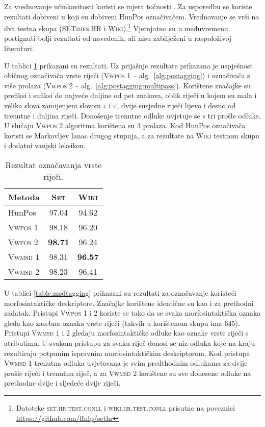 Za vrednovanje učinkovitosti koristi se mjera točnosti . Za
usporedbu se koriste rezultati dobiveni u \citep{agic2013lemmatization} koji su
dobiveni HunPos označivačem. Vrednovanje se vrši na dva testna skupa
(\textsc{SETimes.HR} i \textsc{Wiki}).\footnote{Datoteke
\textsc{set.hr.test.conll} i \textsc{wiki.hr.test.conll} prisutne na poveznici
\url{https://github.com/ffnlp/sethr}} Vjerojatno su u međuvremenu postignuti
bolji rezultati od navedenih, ali nisu zabilježeni u raspoloživoj literaturi.

U tablici \ref{table:postagging} prikazani su rezultati. Uz prijašnje rezultate
prikazana je uspješnost običnog označivača vrste riječi (\textsc{Vwpos 1} --
alg.~\ref{alg:postagging}) i označivača s više prolaza (\textsc{Vwpos 2} --
alg.~\ref{alg:postagging:multipass}). Korištene značajke su prefiksi i sufiksi
do najveće duljine od pet znakova, oblik riječi u kojem su mala i velika slova
zamijenjeni slovom \textsc{l} i \textsc{u}, dvije susjedne riječi lijevo i desno
od trenutne i duljina riječi. Donošenje trenutne odluke uvjetuje se s tri prošle
odluke. U slučaju \textsc{Vwpos 2} algoritma korištena su 3 prolaza. Kod HunPos
označivača koristi se Markovljev lanac drugog stupnja, a za rezultate na
\textsc{Wiki} testnom skupu i dodatni vanjski leksikon.

\begin{table}
\centering
\caption[Rezultat označavanja vrste riječi.]{Rezultat označavanja vrste riječi.}
\label{table:postagging}
\begin{tabular}{|l|c|c|}
\hline
Metoda             & \textsc{Set}   & \textsc{Wiki}  \\ \hline \hline
HunPos             & 97.04          & 94.62          \\
\textsc{Vwpos 1}   & 98.18          & 96.20          \\
\textsc{Vwpos 2}   & \textbf{98.71} & 96.24          \\
\textsc{Vwmsd} 1   & 98.31          & \textbf{96.57} \\
\textsc{Vwmsd} 2   & 98.23          & 96.41          \\ \hline
\end{tabular}
\end{table}

U tablici \ref{table:msdtagging} prikazani su rezultati za označavanje koristeći
morfosintaktičke deskriptore. Značajke korištene identične su kao i za prethodni
zadatak. Pristupi \textsc{Vwpos 1} i \textsc{2} koriste se tako da se svaka
morfosintaktička oznaka gleda kao zasebna oznaka vrste riječi (takvih u
korištenom skupu ima 645). Pristupi \textsc{Vwmsd} 1 i 2 gledaju
morfosintaktičke odluke kao oznake vrste riječi s atributima. U svakom pristupu
za svaku riječ donosi se niz odluka koje na kraju rezultiraju potpunim ispravnim
morfosintaktičkim deskriptorom.  Kod pristupa \textsc{Vwmsd 1} trenutna odluka
uvjetovana je svim predthodnim odlukama za dvije prošle riječi i trenutnu riječ,
a za \textsc{Vwmsd 2} korištene su sve donesene odluke na prethodne dvije i
sljedeće dvije riječi.

